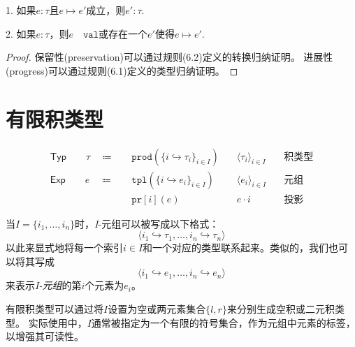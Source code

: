 \begin{theorem}[安全定理]\label{theorem:safety}
1. 如果$e:\tau$且$e\longmapsto e'$成立，则$e':\tau$.

2. 如果$e:\tau$，则$e\quad \mathtt{val}$或存在一个$e'$使得$e\longmapsto e'$.
\end{theorem}
\begin{proof}
保留性(preservation)可以通过规则(6.2)定义的转换归纳证明。
进展性(progress)可以通过规则(6.1)定义的类型归纳证明。
\end{proof}

\section{有限积类型}
\begin{equation*}
\begin{aligned}
\mathsf{Typ} \qquad \tau \quad \Coloneqq \quad &\mathtt{prod}(\{i \hookrightarrow \tau_i \}_{i\in I})
\quad &\langle \tau_i \rangle_{i\in I} \quad &\mbox{积类型} \\
\mathsf{Exp} \qquad e \quad \Coloneqq \quad &\mathtt{tpl}(\{i \hookrightarrow e_i \}_{i\in I})
\quad &\langle e_i \rangle_{i\in I} \quad &\mbox{元组} \\
&\mathtt{pr}[i](e) \quad &e \cdot i \quad &\mbox{投影}
\end{aligned}
\end{equation*}


当$I=\{i_1,\dots,i_n\}$时，\textit{I}-元组可以被写成以下格式：
$$\langle i_1 \hookrightarrow \tau_1, \dots, i_n \hookrightarrow \tau_n \rangle$$
以此来显式地将每一个索引$i\in I$和一个对应的类型联系起来。类似的，我们也可以将其写成
$$\langle i_1 \hookrightarrow e_1, \dots, i_n \hookrightarrow e_n \rangle$$
来表示\textit{I-元组}的第$i$个元素为$e_i$。

有限积类型可以通过将$I$设置为空或两元素集合$\{l,r\}$来分别生成空积或二元积类型。
实际使用中，$I$通常被指定为一个有限的符号集合，作为元组中元素的标签，以增强其可读性。

